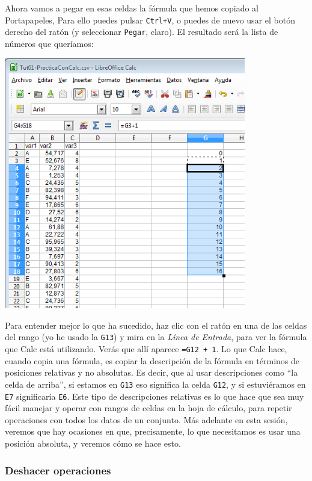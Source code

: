\documentclass[10pt,a4paper]{article}\usepackage[]{graphicx}\usepackage[]{color}
\begin{document}
Ahora vamos a pegar en esas celdas la fórmula que hemos copiado al Portapapeles, Para ello puedes pulsar {\tt Ctrl+V}, o puedes de nuevo usar el botón derecho del ratón (y seleccionar {\tt Pegar}, claro). El resultado será la lista de números que queríamos:
    \begin{center}
    \includegraphics[height=11cm]{../fig/Tut01-Calc-Formula-05.png}
    \end{center}
Para entender mejor lo que ha sucedido, haz clic con el ratón en una de las celdas del rango (yo he usado la {\tt G13}) y mira en la {\em Línea de Entrada}, para ver la fórmula que Calc está utilizando. Verás que allí aparece {\tt =G12 + 1}. Lo que Calc hace, cuando copia una fórmula, es copiar la descripción de la fórmula en términos de posiciones {\sf relativas} y no {\sf absolutas}. Es decir, que al usar descripciones como ``la celda de arriba'', si estamos en {\tt G13} eso significa la celda {\tt G12}, y si estuviéramos en {\tt E7} significaría {\tt E6}. Este tipo de descripciones relativas es lo que hace que sea muy fácil manejar y operar con rangos de celdas en la hoja de cálculo, para repetir operaciones con todos los datos de un conjunto. Más adelante en esta sesión, veremos que hay ocasiones en que, precisamente, lo que necesitamos es usar una posición absoluta, y veremos cómo se hace esto.

\subsubsection*{Deshacer operaciones}
\label{tut01:subsubsec:DeshacerOperaciones}
\end{document}

